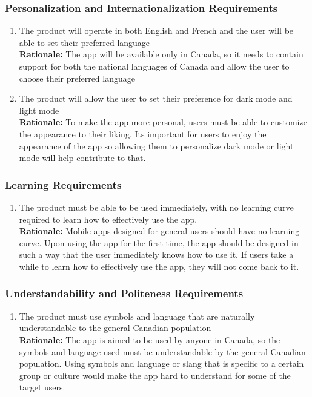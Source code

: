 \documentclass[]{article}
\begin{document}
\subsubsection{Personalization and Internationalization Requirements}
\label{ssub:personalization_and_internationalization_requirements}
\begin{enumerate}[{UH-PI}1. ]
	\item The product will operate in both English and French and the user will be able to set their preferred language \\
	{\bf Rationale:} The app will be available only in Canada, so it needs to contain support for both the national languages of Canada and allow the user to choose their preferred language
	\item The product will allow the user to set their preference for dark mode and light mode \\
	{\bf Rationale:} To make the app more personal, users must be able to customize the appearance to their liking. Its important for users to enjoy the appearance of the app so allowing them to personalize dark mode or light mode will help contribute to that.
\end{enumerate}

\subsubsection{Learning Requirements}
\label{ssub:learning_requirements}
\begin{enumerate}[{UH-L}1. ]
	\item The product must be able to be used immediately, with no learning curve required to learn how to effectively use the app. \\
	{\bf Rationale:} Mobile apps designed for general users should have no learning curve. Upon using the app for the first time, the app should be designed in such a way that the user immediately knows how to use it. If users take a while to learn how to effectively use the app, they will not come back to it.
\end{enumerate}

\subsubsection{Understandability and Politeness Requirements}
\label{ssub:understandability_and_politeness_requirements}
\begin{enumerate}[{UH-UP}1. ]
	\item The product must use symbols and language that are naturally understandable to the general Canadian population \\
	{\bf Rationale:} The app is aimed to be used by anyone in Canada, so the symbols and language used must be understandable by the general Canadian population. Using symbols and language or slang that is specific to a certain group or culture would make the app hard to understand for some of the target users.
\end{enumerate}
\end{document}
